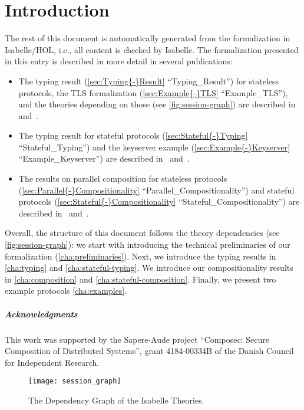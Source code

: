 \documentclass[10pt,DIV16,a4paper,abstract=true,twoside=semi,openright]
{scrreprt}
\begin{document}
\chapter{Introduction}
The rest of this document is automatically generated from the formalization in Isabelle/HOL, i.e., all content is checked by Isabelle.
The formalization presented in this entry is described in more detail in several publications:
\begin{itemize}
\item The typing result (\autoref{sec:Typing{-}Result} ``Typing\_Result'') for stateless protocols, the TLS formalization (\autoref{sec:Example{-}TLS} ``Example\_TLS''), and the theories depending on those (see \autoref{fig:session-graph}) are described in~\cite{hess.ea:formalizing:2017} and~\cite[chapter 3]{hess:typing:2018}.
\item The typing result for stateful protocols (\autoref{sec:Stateful{-}Typing} ``Stateful\_Typing'') and the keyserver example (\autoref{sec:Example{-}Keyserver} ``Example\_Keyserver'') are described in~\cite{hess.ea:typing:2018} and~\cite[chapter 4]{hess:typing:2018}.
\item The results on parallel composition for stateless protocols (\autoref{sec:Parallel{-}Compositionality} ``Parallel\_Compositionality'') and stateful protocols (\autoref{sec:Stateful{-}Compositionality} ``Stateful\_Compositionality'') are described in~\cite{hess.ea:stateful:2018} and~\cite[chapter 5]{hess:typing:2018}.
\end{itemize}
Overall, the structure of this document follows the theory dependencies (see \autoref{fig:session-graph}): we start with introducing the technical preliminaries of our formalization (\autoref{cha:preliminaries}).
Next, we introduce the typing results in \autoref{cha:typing} and \autoref{cha:stateful-typing}.
We introduce our compositionality results in \autoref{cha:composition} and \autoref{cha:stateful-composition}.
Finally, we present two example protocols \autoref{cha:examples}.

\paragraph{Acknowledgments}
This work was supported by the Sapere-Aude project ``Composec: Secure Composition of Distributed Systems'', grant 4184-00334B of the Danish Council for Independent Research.

\clearpage

\begin{figure}
  \centering
  \texttt{[image: session\_graph]}
  \caption{The Dependency Graph of the Isabelle Theories.\label{fig:session-graph}}
\end{figure}
\end{document}
